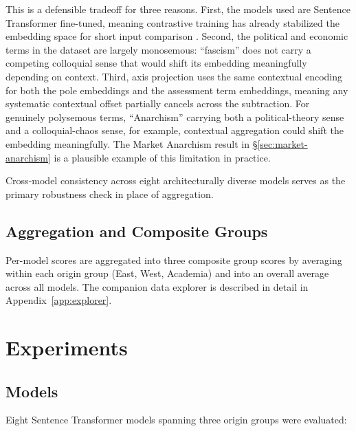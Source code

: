 \documentclass[11pt, letterpaper]{article}
\begin{document}
This is a defensible tradeoff for three reasons. First, the models used are Sentence Transformer fine-tuned, meaning contrastive training has already stabilized the embedding space for short input comparison \cite{reimers2019}. Second, the political and economic terms in the dataset are largely monosemous: ``fascism'' does not carry a competing colloquial sense that would shift its embedding meaningfully depending on context. Third, axis projection uses the same contextual encoding for both the pole embeddings and the assessment term embeddings, meaning any systematic contextual offset partially cancels across the subtraction. For genuinely polysemous terms, ``Anarchism'' carrying both a political-theory sense and a colloquial-chaos sense, for example, contextual aggregation could shift the embedding meaningfully. The Market Anarchism result in \hyperref[sec:market-anarchism]{§\ref*{sec:market-anarchism}} is a plausible example of this limitation in practice.

Cross-model consistency across eight architecturally diverse models serves as the primary robustness check in place of aggregation.

\subsection{Aggregation and Composite Groups}
\label{sec:agg-groups}

Per-model scores are aggregated into three composite group scores by averaging within each origin group (East, West, Academia) and into an overall average across all models. The companion data explorer is described in detail in Appendix~\ref{app:explorer}.

\newpage

\section{Experiments}

\subsection{Models}

Eight Sentence Transformer models spanning three origin groups were evaluated:
\end{document}
